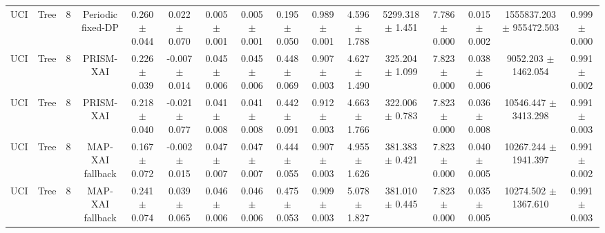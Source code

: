 \begin{tabular}{lccccccccccccccc}
UCI & Tree & 8 & Periodic fixed-DP & 0.260 $\pm$ 0.044 & 0.022 $\pm$ 0.070 & 0.005 $\pm$ 0.001 & 0.005 $\pm$ 0.001 & 0.195 $\pm$ 0.050 & 0.989 $\pm$ 0.001 & 4.596 $\pm$ 1.788 & 5299.318 $\pm$ 1.451 & 7.786 $\pm$ 0.000 & 0.015 $\pm$ 0.002 & 1555837.203 $\pm$ 955472.503 & 0.999 $\pm$ 0.000 \\
UCI & Tree & 8 & PRISM-XAI & 0.226 $\pm$ 0.039 & -0.007 $\pm$ 0.014 & 0.045 $\pm$ 0.006 & 0.045 $\pm$ 0.006 & 0.448 $\pm$ 0.069 & 0.907 $\pm$ 0.003 & 4.627 $\pm$ 1.490 & 325.204 $\pm$ 1.099 & 7.823 $\pm$ 0.000 & 0.038 $\pm$ 0.006 & 9052.203 $\pm$ 1462.054 & 0.991 $\pm$ 0.002 \\
UCI & Tree & 8 & PRISM-XAI & 0.218 $\pm$ 0.040 & -0.021 $\pm$ 0.077 & 0.041 $\pm$ 0.008 & 0.041 $\pm$ 0.008 & 0.442 $\pm$ 0.091 & 0.912 $\pm$ 0.003 & 4.663 $\pm$ 1.766 & 322.006 $\pm$ 0.783 & 7.823 $\pm$ 0.000 & 0.036 $\pm$ 0.008 & 10546.447 $\pm$ 3413.298 & 0.991 $\pm$ 0.003 \\
UCI & Tree & 8 & MAP-XAI fallback & 0.167 $\pm$ 0.072 & -0.002 $\pm$ 0.015 & 0.047 $\pm$ 0.007 & 0.047 $\pm$ 0.007 & 0.444 $\pm$ 0.055 & 0.907 $\pm$ 0.003 & 4.955 $\pm$ 1.626 & 381.383 $\pm$ 0.421 & 7.823 $\pm$ 0.000 & 0.040 $\pm$ 0.005 & 10267.244 $\pm$ 1941.397 & 0.991 $\pm$ 0.002 \\
UCI & Tree & 8 & MAP-XAI fallback & 0.241 $\pm$ 0.074 & 0.039 $\pm$ 0.065 & 0.046 $\pm$ 0.006 & 0.046 $\pm$ 0.006 & 0.475 $\pm$ 0.053 & 0.909 $\pm$ 0.003 & 5.078 $\pm$ 1.827 & 381.010 $\pm$ 0.445 & 7.823 $\pm$ 0.000 & 0.035 $\pm$ 0.005 & 10274.502 $\pm$ 1367.610 & 0.991 $\pm$ 0.003 \\
\bottomrule
\end{tabular}
